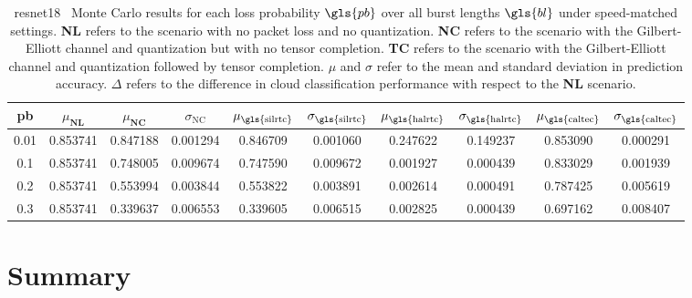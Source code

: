 \begin{table}[H]
	\centering
	\caption[Summarized ResNet18 Monte Carlo results with speed-matched tensor completion]{\gls{resnet18} \addone~Monte Carlo results for each loss probability $\gls{pb}$ over all burst lengths $\gls{bl}$ under speed-matched settings. \textbf{NL} refers to the scenario with no packet loss and no quantization. \textbf{NC} refers to the scenario with the Gilbert-Elliott channel and quantization but with no tensor completion. \textbf{TC} refers to the scenario with the Gilbert-Elliott channel and quantization followed by tensor completion. $\mu$ and $\sigma$ refer to the mean and standard deviation in prediction accuracy. $\Delta$ refers to the difference in cloud classification performance with respect to the \textbf{NL} scenario.}\label{table:expts:mc:speed}
	\begin{adjustbox}{max width = \textwidth}
		\begin{tabular}{|c|c|cc|cc|cc|cc|}
			\hline
			\gls{pb} &   $\mu_{\textbf{NL}}$ &   $\mu_{\textbf{NC}}$ &    $\sigma_{\text{NC}}$ &  $\mu_{\text{\gls{silrtc}}}$ &  $\sigma_{\text{\gls{silrtc}}}$ &  $\mu_{\text{\gls{halrtc}}}$ &  $\sigma_{\text{\gls{halrtc}}}$ &  $\mu_{\text{\gls{caltec}}}$ &  $\sigma_{\text{\gls{caltec}}}$\\
			\hline \hline
			0.01 &  0.853741 &  0.847188 &  0.001294 &     0.846709 &    0.001060 &     0.247622 &    0.149237 &    \cellcolor{green!25} 0.853090 &    0.000291 \\
			0.1 &  0.853741 &  0.748005 &  0.009674 &     0.747590 &    0.009672 &     0.001927 &    0.000439 &    \cellcolor{green!25} 0.833029 &    0.001939 \\
			0.2 &  0.853741 &  0.553994 &  0.003844 &     0.553822 &    0.003891 &     0.002614 &    0.000491 &    \cellcolor{green!25} 0.787425 &    0.005619 \\
			0.3 &  0.853741 &  0.339637 &  0.006553 &     0.339605 &    0.006515 &     0.002825 &    0.000439 &     \cellcolor{green!25}0.697162 &    0.008407 \\
			\hline
		\end{tabular}
		\end{adjustbox}
\end{table}


\section{Summary} \label{sec:expts:summary}

